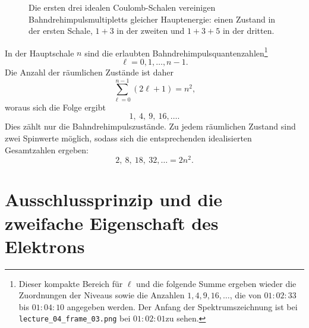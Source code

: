 \begin{figure}[htbp]
\centering
{}
\caption{Die ersten drei idealen Coulomb-Schalen vereinigen Bahndrehimpulsmultipletts gleicher Hauptenergie: einen Zustand in der ersten Schale, \(1+3\) in der zweiten und \(1+3+5\) in der dritten.}
\end{figure}

In der Hauptschale \(n\) sind die erlaubten Bahndrehimpulsquantenzahlen\footnote{Dieser kompakte Bereich für \(\ell\) und die folgende Summe ergeben wieder die Zuordnungen der Niveaus sowie die Anzahlen \(1,4,9,16,\ldots\), die von \(01{:}02{:}33\) bis \(01{:}04{:}10\) angegeben werden. Der Anfang der Spektrumszeichnung ist bei \texttt{lecture\_04\_frame\_03.png} bei \(01{:}02{:}01\)zu sehen.}
\[
\ell=0,1,\ldots,n-1.
\]
Die Anzahl der räumlichen Zustände ist daher
\begin{equation}
\sum_{\ell=0}^{n-1}(2\ell+1)=n^{2},
\end{equation}woraus sich die Folge ergibt
\begin{equation}
1,\ 4,\ 9,\ 16,\ldots .
\end{equation}
Dies zählt nur die Bahndrehimpulszustände. Zu jedem räumlichen Zustand sind zwei Spinwerte möglich, sodass sich die entsprechenden idealisierten Gesamtzahlen ergeben:
\begin{equation}
2,\ 8,\ 18,\ 32,\ldots=2n^{2}.
\end{equation}

\section{Ausschlussprinzip und die zweifache Eigenschaft des Elektrons}

